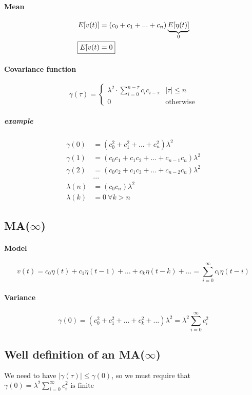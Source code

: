 \documentclass{article}
\begin{document}
\paragraph{Mean}
\begin{alignat*}{2}
E[v(t)]&=(c_0+c_1+...+c_n)\underbrace{E[\eta(t)]}_0\\
\Aboxed{E[v(t)&=0}
\end{alignat*}

\paragraph{Covariance function}
\[
\boxed{
\gamma(\tau)=
\begin{cases}
\lambda^2\cdot \sum_{i=0}^{n-\tau} c_ic_{i-\tau}	&	|\tau|\leq n\\
0	& \text{otherwise}
\end{cases}
}
\]
\subparagraph{example}
\begin{align*}
\gamma(0)&=(c_0^2+c_1^2+...+c_n^2)\lambda^2\\
\gamma(1)&=(c_0c_1+c_1c_2+...+c_{n-1}c_n)\lambda^2\\
\gamma(2)&=(c_0c_2+c_1c_3+...+c_{n-2}c_n)\lambda^2\\
&...\\
\lambda(n)&=(c_0c_n)\lambda^2\\
\lambda(k)&=0\:\forall k>n
\end{align*}

\subsection{MA($\infty$)}
\paragraph{Model}
\[
v(t)=c_0\eta(t)+c_1\eta(t-1)+...+c_k\eta(t-k)+...=\sum_{i=0}^{\infty}c_i\eta(t-i)
\]
\paragraph{Variance}
\[
\gamma(0)
=(c_0^2+c_1^2+...+c_k^2+...) \lambda^2
=\lambda^2 \sum_{i=0}^{\infty} c_i^2
\]
\subsection{Well definition of an MA($\infty$)}
We need to have $|\gamma(\tau)|\leq \gamma(0)$, so we must require that \\
$\boxed{ \gamma(0)=\lambda^2 \sum_{i=0}^{\infty} c_i^2 \text{ is finite}}$
\end{document}
